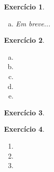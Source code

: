 \documentclass[letter,11pt]{article}
\newtheorem{exer}{Exercício}
\begin{document}
\begin{exer}
\begin{enumerate}[a)]
\item %
Em breve...

\end{enumerate}
\end{exer}


\begin{exer} \rm
  \begin{enumerate}[a)]
    \item %

    \item %

    \item %
  
    \item %

    \item %
\end{enumerate}
\end{exer}


\begin{exer} \rm
\end{exer}


\begin{exer} \rm

  \begin{enumerate}
    \item %
    
    \item %
    
    \item %
  \end{enumerate}
\end{exer}
\end{document}
